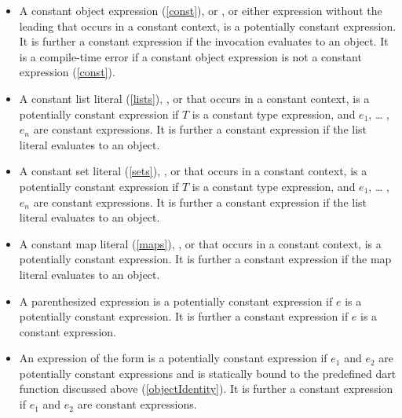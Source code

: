 \documentclass[makeidx]{article}
\begin{document}
{\begin{itemize}
\item
  A constant object expression (\ref{const}),
   or
  ,
  or either expression without the leading \CONST{} that occurs in
  a constant context,
  is a potentially constant expression.
  It is further a constant expression if the invocation evaluates to an object.
  It is a compile-time error if a constant object expression is
  not a constant expression (\ref{const}).

\item
  A constant list literal (\ref{lists}),
  , or
  that occurs in a constant context,
  is a potentially constant expression if $T$ is a constant type expression,
  and $e_1$, \ldots{} , $e_n$ are constant expressions.
  It is further a constant expression
  if the list literal evaluates to an object.

\item
  A constant set literal (\ref{sets}),
  , or
  that occurs in a constant context,
  is a potentially constant expression
  if $T$ is a constant type expression,
  and $e_1$, \ldots{} , $e_n$ are constant expressions.
  It is further a constant expression
  if the list literal evaluates to an object.

\item
  A constant map literal (\ref{maps}),
  , or
  that occurs in a constant context,
  is a potentially constant expression.
  It is further a constant expression
  if the map literal evaluates to an object.

\item
  A parenthesized expression  is
  a potentially constant expression
  if $e$ is a potentially constant expression.
  It is further a constant expression if $e$ is a constant expression.

\item
  An expression of the form  is
  a potentially constant expression
  if $e_1$ and $e_2$ are potentially constant expressions
  and  is statically bound to
  the predefined dart function  discussed above
  (\ref{objectIdentity}).
  It is further a constant expression
  if $e_1$ and $e_2$ are constant expressions.


\end{itemize}}
\end{document}
